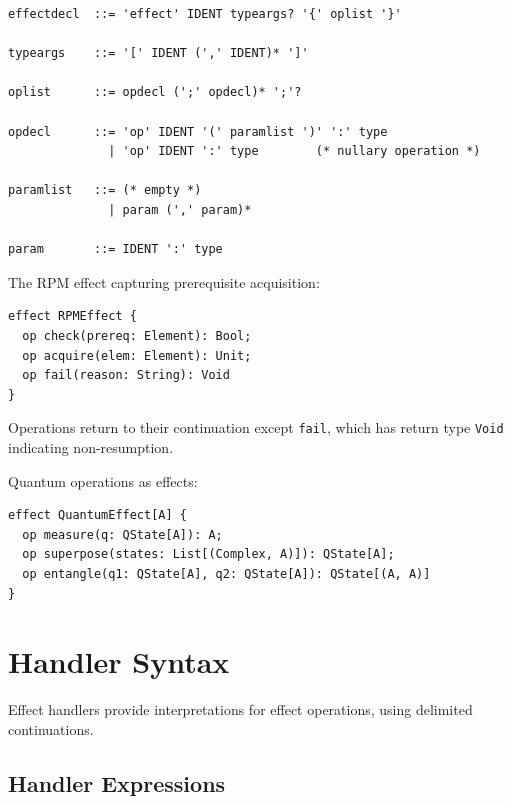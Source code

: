 \begin{definition}
\label{def:effect-decl-grammar}
\begin{lstlisting}[style=bnf,caption={Effect Declaration Grammar}]
effectdecl  ::= 'effect' IDENT typeargs? '{' oplist '}'

typeargs    ::= '[' IDENT (',' IDENT)* ']'

oplist      ::= opdecl (';' opdecl)* ';'?

opdecl      ::= 'op' IDENT '(' paramlist ')' ':' type
              | 'op' IDENT ':' type        (* nullary operation *)

paramlist   ::= (* empty *)
              | param (',' param)*

param       ::= IDENT ':' type
\end{lstlisting}
\end{definition}

\begin{example}
\label{ex:rpm-effect}
The RPM effect capturing prerequisite acquisition:
\begin{verbatim}
effect RPMEffect {
  op check(prereq: Element): Bool;
  op acquire(elem: Element): Unit;
  op fail(reason: String): Void
}
\end{verbatim}
Operations return to their continuation except \texttt{fail}, which has return type \texttt{Void} indicating non-resumption.
\end{example}

\begin{example}
\label{ex:quantum-effect}
Quantum operations as effects:
\begin{verbatim}
effect QuantumEffect[A] {
  op measure(q: QState[A]): A;
  op superpose(states: List[(Complex, A)]): QState[A];
  op entangle(q1: QState[A], q2: QState[A]): QState[(A, A)]
}
\end{verbatim}
\end{example}

\section{Handler Syntax}
\label{sec:handler-syntax}

Effect handlers provide interpretations for effect operations, using delimited continuations.

\subsection{Handler Expressions}
\label{subsec:handler-expr}

